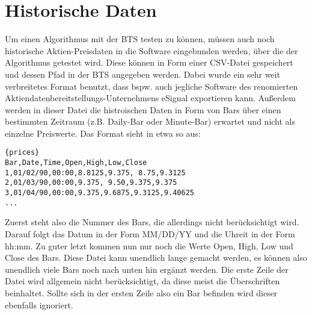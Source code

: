 \section{Historische Daten}

Um einen Algorithmus mit der \gls{BTS} testen zu können, müssen auch noch historische Aktien-Preisdaten in die Software eingebunden werden, über die der Algorithmus getestet wird. Diese können in Form einer \gls{CSV}-Datei gespeichert und dessen Pfad in der \gls{BTS} angegeben werden. Dabei wurde ein sehr weit verbreitetes Format benutzt, dass bspw. auch jegliche Software des renomierten Aktiendatenbereitstellungs-Unternehmens eSignal exportieren kann. Außerdem werden in dieser Datei die histroischen Daten in Form von \glspl{Bar} über einen bestimmten Zeitraum (z.B. Daily-\gls{Bar} oder Minute-\gls{Bar}) erwartet und nicht als einzelne Preiswerte. Das Format sieht in etwa so aus:

\begin{lstlisting}[caption=Aufbau der \gls{CSV}-Datei]{prices}
Bar,Date,Time,Open,High,Low,Close
1,01/02/90,00:00,8.8125,9.375, 8.75,9.3125
2,01/03/90,00:00,9.375, 9.50,9.375,9.375
3,01/04/90,00:00,9.375,9.6875,9.3125,9.40625
...
\end{lstlisting}

Zuerst steht also die Nummer des Bars, die allerdings nicht berücksichtigt wird. Darauf folgt das Datum in der Form MM/DD/YY und die Uhreit in der Form hh:mm. Zu guter letzt kommen nun nur noch die Werte Open, High, Low und Close des \glspl{Bar}. Diese Datei kann unendlich lange gemacht werden, es können also unendlich viele Bars noch nach unten hin ergänzt werden. Die erste Zeile der Datei wird allgemein nicht berücksichtigt, da diese meist die Überschriften beinhaltet. Sollte sich in der ersten Zeile also ein Bar befinden wird dieser ebenfalls ignoriert.